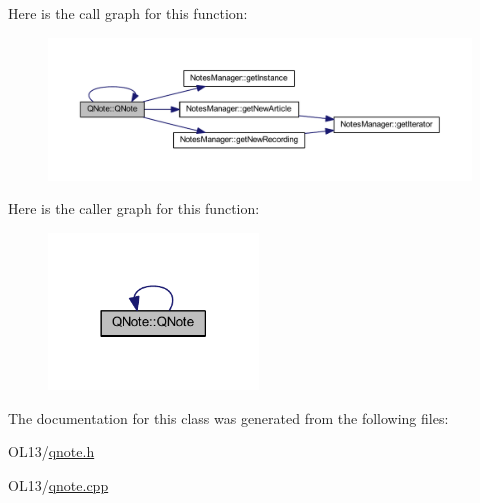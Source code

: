 Here is the call graph for this function\+:\nopagebreak
\begin{figure}[H]
\begin{center}
\leavevmode
\includegraphics[width=350pt]{class_q_note_a4f3980466d58be3cb5e15d2e45d74840_cgraph}
\end{center}
\end{figure}
Here is the caller graph for this function\+:\nopagebreak
\begin{figure}[H]
\begin{center}
\leavevmode
\includegraphics[width=158pt]{class_q_note_a4f3980466d58be3cb5e15d2e45d74840_icgraph}
\end{center}
\end{figure}


The documentation for this class was generated from the following files\+:\begin{DoxyCompactItemize}
\item 
O\+L13/\hyperlink{qnote_8h}{qnote.\+h}\item 
O\+L13/\hyperlink{qnote_8cpp}{qnote.\+cpp}\end{DoxyCompactItemize}
